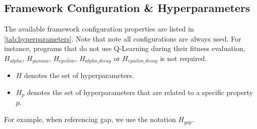 \documentclass[12pt, final]{dalcsthesis}
\begin{document}
\subsection{Framework Configuration \& Hyperparameters}

The available framework configuration properties are listed in \ref{tab:hyperparameters}. Note that note all configurations are always used.
For instance, programs that do not use Q-Learning during their fitness evaluation, $H_{alpha}$, $H_{gamma}$, $H_{epsilon}$, $H_{alpha\_decay}$ or $H_{epsilon\_decay}$ is not required.
\begin{itemize}
	\item $H$ denotes the set of hyperparameters.
	\item $H_{p}$ denotes the set of hyperparameters that are related to a specific property $p$.
\end{itemize}
For example, when referencing gap, we use the notation $H_{gap}$.
\end{document}

